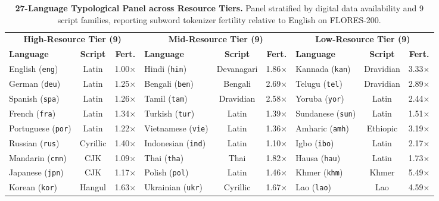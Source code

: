 \documentclass[11pt]{article}
\begin{document}
\begin{table}[!tp]
\centering
\small
\setlength{\tabcolsep}{6pt}
\begin{tabular*}{\textwidth}{@{\extracolsep{\fill}}lcc|lcc|lcc@{}}
\toprule
\multicolumn{3}{c|}{\textbf{High-Resource Tier (9)}} & \multicolumn{3}{c|}{\textbf{Mid-Resource Tier (9)}} & \multicolumn{3}{c}{\textbf{Low-Resource Tier (9)}} \\
\textbf{Language} & \textbf{Script} & \textbf{Fert.} & \textbf{Language} & \textbf{Script} & \textbf{Fert.} & \textbf{Language} & \textbf{Script} & \textbf{Fert.} \\
\midrule
English (\texttt{eng}) & Latin & 1.00$\times$ & Hindi (\texttt{hin}) & Devanagari & 1.86$\times$ & Kannada (\texttt{kan}) & Dravidian & 3.33$\times$ \\
German (\texttt{deu}) & Latin & 1.25$\times$ & Bengali (\texttt{ben}) & Bengali & 2.69$\times$ & Telugu (\texttt{tel}) & Dravidian & 2.89$\times$ \\
Spanish (\texttt{spa}) & Latin & 1.26$\times$ & Tamil (\texttt{tam}) & Dravidian & 2.58$\times$ & Yoruba (\texttt{yor}) & Latin & 2.44$\times$ \\
French (\texttt{fra}) & Latin & 1.34$\times$ & Turkish (\texttt{tur}) & Latin & 1.39$\times$ & Sundanese (\texttt{sun}) & Latin & 1.51$\times$ \\
Portuguese (\texttt{por}) & Latin & 1.22$\times$ & Vietnamese (\texttt{vie}) & Latin & 1.36$\times$ & Amharic (\texttt{amh}) & Ethiopic & 3.19$\times$ \\
Russian (\texttt{rus}) & Cyrillic & 1.40$\times$ & Indonesian (\texttt{ind}) & Latin & 1.10$\times$ & Igbo (\texttt{ibo}) & Latin & 2.17$\times$ \\
Mandarin (\texttt{cmn}) & CJK & 1.09$\times$ & Thai (\texttt{tha}) & Thai & 1.82$\times$ & Hausa (\texttt{hau}) & Latin & 1.73$\times$ \\
Japanese (\texttt{jpn}) & CJK & 1.17$\times$ & Polish (\texttt{pol}) & Latin & 1.46$\times$ & Khmer (\texttt{khm}) & Khmer & 5.49$\times$ \\
Korean (\texttt{kor}) & Hangul & 1.63$\times$ & Ukrainian (\texttt{ukr}) & Cyrillic & 1.67$\times$ & Lao (\texttt{lao}) & Lao & 4.59$\times$ \\
\bottomrule
\end{tabular*}
\caption{\textbf{27-Language Typological Panel across Resource Tiers.} Panel stratified by digital data availability \citep{joshi2020state} and 9 script families, reporting subword tokenizer fertility relative to English on FLORES-200.}
\label{tab:languages}
\end{table}
\end{document}
